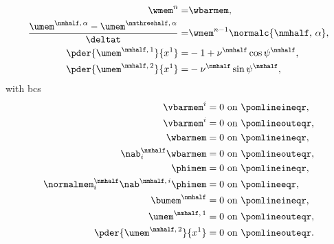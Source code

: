 \begin{itemize}
{\begin{align}
            \label{eq_fl_mem_mem_disc_5}
            \wmem^n                                                                     = & \wbarmem,                                                    \\
            \label{eq_fl_mem_mem_disc_6}
            \frac{\umem^{\nmhalf,\, \alpha} - \umem^{\nmthreehalf,\, \alpha}}{\deltat}  = &
            \wmem^{n-1} \normalc{\nmhalf, \, \alpha},                                                                                                    \\
            \label{eq_fl_mem_mem_disc_7}
            \pder {\umem^{\nmhalf,\,1}}{x^1}                                            = &
            -1 + \nu^\nmhalf \cos \psi^\nmhalf,                                                                                                          \\
            \label{eq_fl_mem_mem_disc_8}
            \pder {\umem^{\nmhalf, \, 2}}{x^1}                                          = &
            -\nu^\nmhalf \sin \psi^\nmhalf,
        \end{align}
        with \acp{bc}
        \begin{align}
            \label{bc_fl_mem_mem_1_disc}
            \vbarmem^i                                         & = 0 \text{ on } \pomlineineqr,  \\
            \label{bc_fl_mem_mem_2_disc}
            \vbarmem^i                                         & = 0 \text{ on } \pomlineouteqr, \\
            \label{bc_fl_mem_mem_3_disc}
            \wbarmem                                           & = 0 \text{ on } \pomlineineqr,  \\
            \label{bc_fl_mem_mem_4_disc}
            \nab^\nmhalf_i \wbarmem                            & = 0 \text{ on } \pomlineouteqr, \\
            \label{bc_fl_mem_mem_5_disc}
            \phimem                                            & = 0 \text{ on } \pomlineineqr,  \\
            \label{bc_fl_mem_mem_6_disc}
            \normalmem^\nmhalf_i  \nab^{\nmhalf, \, i} \phimem & = 0 \text{ on } \pomlineeqr,    \\
            \bumem^{\nmhalf}                                   & = 0 \text{ on } \pomlineineqr,  \\
            \umem^{\nmhalf,\, 1}                               & = 0 \text{ on } \pomlineouteqr, \\
            \pder{\umem^{\nmhalf, \, 2}}{x^1}                  & = 0 \text{ on } \pomlineouteqr.
        \end{align}

}
\end{itemize}
